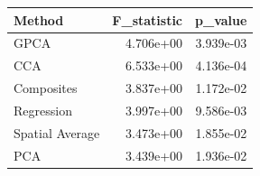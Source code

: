 \begin{tabular}{lrr}
\toprule
Method & F_statistic & p_value \\
\midrule
GPCA & 4.706e+00 & 3.939e-03 \\
CCA & 6.533e+00 & 4.136e-04 \\
Composites & 3.837e+00 & 1.172e-02 \\
Regression & 3.997e+00 & 9.586e-03 \\
Spatial Average & 3.473e+00 & 1.855e-02 \\
PCA & 3.439e+00 & 1.936e-02 \\
\bottomrule
\end{tabular}
